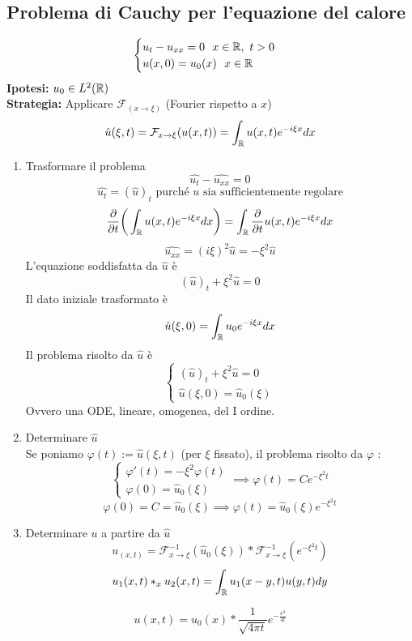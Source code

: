 \subsection{Problema di Cauchy per l'equazione del calore}
\[\begin{cases}
	u_t-u_{x x}=0\ \ x\in \mathbb{R},\ t>0\\
	u(x,0)=u_0(x)\ \ x\in \mathbb{R}
\end{cases}
 \]
\textbf{Ipotesi:} $u_0\in L^{2}(\mathbb{R})$ 
\\\textbf{Strategia:} Applicare $\mathcal F_{(x\to \xi)}$ (Fourier rispetto a $x$)
\[\hat{u}(\xi, t)=\mathcal F_{x\to \xi}(u(x,t))= \int_{\mathbb{R}}^{} u(x,t) e^{-i\xi x}dx\]
\begin{enumerate}
	\item Trasformare il problema
		\[\widehat{u_t}- \widehat{u_{x x}}=0\]
		\[\hat{u_t}=(\hat{u})_t\text{ purché }u\text{ sia sufficientemente regolare}\]
		\[\frac{\partial }{\partial t} \bigg( \int_{\mathbb{R}}^{} u(x,t)e^{-i\xi x}dx\bigg)= \int_{\mathbb{R}}^{} \frac{\partial }{\partial t} u(x,t)e^{-i\xi x}dx\]
		\[\widehat{u _{x x}}=(i\xi )^2 \hat{u}=-\xi^2 \hat{u}\]
		L'equazione soddisfatta da $\hat{u}$ è
		\[(\hat{u})_t + \xi^2 \hat{u}=0\]
		Il dato iniziale trasformato è 
		\[\hat{u}(\xi,0)=\int_{\mathbb{R}}^{} u_0 e^{-i\xi x}dx\]
Il problema risolto da $\hat{u}$ è
\[\begin{cases}
	(\hat{u})_t+\xi^2 \hat{u}=0\\
\hat{u}(\xi,0)=\hat{u}_0(\xi)

\end{cases}
\]
Ovvero una ODE, lineare, omogenea, del I ordine.
\item Determinare $\hat{u}$ 
	\\Se poniamo $\varphi(t):=\hat{u}(\xi, t)$ (per $\xi$ fissato), il problema risolto da $\varphi $ :
	\[\begin{cases}
		\varphi'(t)=-\xi^2 \varphi(t)\\
		\varphi(0)=\hat{u}_0(\xi)
	\end{cases}\implies \varphi(t)=C e^{-\xi^2 t}\]
	\[\varphi(0)=C=\hat{u}_0(\xi)\implies \varphi(t)=\hat{u}_0(\xi)e^{-\xi^2t}\]
\item Determinare $u$ a partire da $\hat{u}$ 
	\[u_(x,t)=\mathcal F^{-1}_{x\to \xi}(\hat{u}_0(\xi))*\mathcal F^{-1}_{x\to \xi}(e^{-\xi^2t})\]
	\[u_1(x,t)*_x u_2(x,t)= \int_{\mathbb{R}}^{} u_1(x-y,t)u(y,t)dy\] 
	
\end{enumerate}
\begin{tcolorbox}
	\[u(x,t)=u_0(x)*\frac{1}{\sqrt{4\pi t} }e^{- \frac{x^2}{4t}}\]
\end{tcolorbox}
